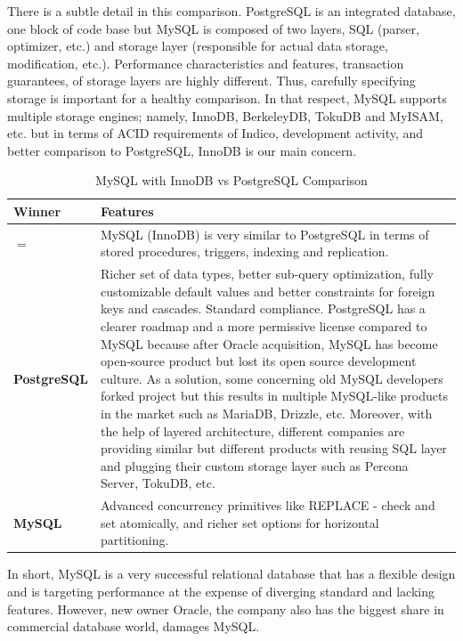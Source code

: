 There is a subtle detail in this comparison. PostgreSQL is an integrated database, one block of code base but MySQL is composed of two layers, SQL (parser, optimizer, etc.) and storage layer (responsible for actual data storage, modification, etc.). Performance characteristics and features, transaction guarantees, of storage layers are highly different. Thus, carefully specifying storage is important for a healthy comparison. In that respect, MySQL supports multiple storage engines; namely, InnoDB, BerkeleyDB, TokuDB and MyISAM, etc. but in terms of ACID requirements of Indico, development activity, and better comparison to PostgreSQL, InnoDB is our main concern.

\begin{table}[H]
  \centering
  \caption{MySQL with InnoDB vs PostgreSQL Comparison}
  \renewcommand{\arraystretch}{1.5}
  \begin{tabular}{| >{\centering\bfseries}m{1in} | >{\centering\arraybackslash}m{4.5in} |}
	\hline
    \textbf{Winner} & \textbf{Features} \\
	\hline
    $=$ & MySQL (InnoDB) is very similar to PostgreSQL in terms of stored procedures, triggers, indexing and replication. \\ \hline
    PostgreSQL & Richer set of data types, better sub-query optimization, fully customizable default values and better constraints for foreign keys and cascades. Standard compliance. PostgreSQL has a clearer roadmap and a more permissive license compared to MySQL because after Oracle acquisition, MySQL has become open-source product but lost its open source development culture. As a solution, some concerning old MySQL developers forked project but this results in multiple MySQL-like products in the market such as MariaDB, Drizzle, etc. Moreover, with the help of layered architecture, different companies are providing similar but different products with reusing SQL layer and plugging their custom storage layer such as Percona Server, TokuDB, etc. \\ \hline
    MySQL & Advanced concurrency primitives like REPLACE - check and set atomically, and richer set options for horizontal partitioning. \\ \hline    
  \end{tabular}
  \label{mysql}
\end{table}

In short, MySQL is a very successful relational database that has a flexible design and is targeting performance at the expense of diverging standard and lacking features. However, new owner Oracle, the company also has the biggest share in commercial database world, damages MySQL.

